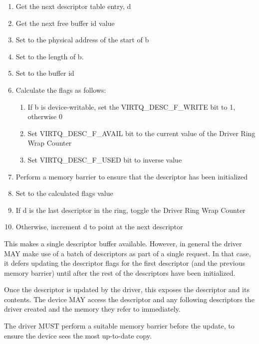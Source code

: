 \begin{enumerate}
\item Get the next descriptor table entry, d
\item Get the next free buffer id value
\item Set  to the physical address of the start of b
\item Set  to the length of b.
\item Set  to the buffer id
\item Calculate the flags as follows:
\begin{enumerate}
\item If b is device-writable, set the VIRTQ_DESC_F_WRITE bit to 1, otherwise 0
\item Set VIRTQ_DESC_F_AVAIL bit to the current value of the Driver Ring Wrap Counter
\item Set VIRTQ_DESC_F_USED bit to inverse value
\end{enumerate}
\item Perform a memory barrier to ensure that the descriptor has
      been initialized
\item Set  to the calculated flags value
\item If d is the last descriptor in the ring, toggle the
      Driver Ring Wrap Counter
\item Otherwise, increment d to point at the next descriptor
\end{enumerate}

This makes a single descriptor buffer available. However, in
general the driver MAY make use of a batch of descriptors as part
of a single request. In that case, it defers updating
the descriptor flags for the first descriptor
(and the previous memory barrier) until after the rest of
the descriptors have been initialized.

Once the descriptor  is updated by the driver, this exposes the
descriptor and its contents.  The device MAY
access the descriptor and any following descriptors the driver created and the
memory they refer to immediately.

The driver MUST perform a suitable memory barrier before the
 update, to ensure the
device sees the most up-to-date copy.

